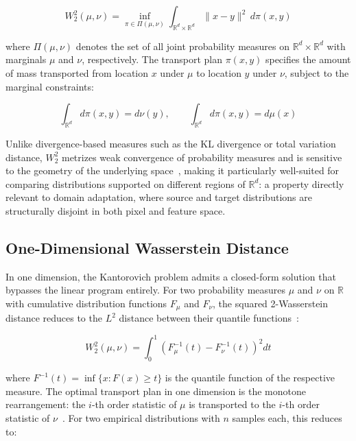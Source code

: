 \documentclass{article}
\begin{document}
	\begin{equation}
		W_2^2(\mu, \nu) = \inf_{\pi \in \Pi(\mu, \nu)} 
		\int_{\mathbb{R}^d \times \mathbb{R}^d} \|x - y\|^2 \, d\pi(x, y)
		\label{eq:kantorovich}
	\end{equation}
	
	where $\Pi(\mu, \nu)$ denotes the set of all joint probability measures on $\mathbb{R}^d \times \mathbb{R}^d$ with marginals $\mu$ and $\nu$, respectively. The transport plan $\pi(x, y)$ specifies the amount of mass transported from location $x$ 
	under $\mu$ to location $y$ under $\nu$, subject to the marginal constraints:
	
	\begin{equation}
		\int_{\mathbb{R}^d} d\pi(x, y) = d\nu(y), \qquad 
		\int_{\mathbb{R}^d} d\pi(x, y) = d\mu(x)
		\label{eq:marginals}
	\end{equation}
	
	Unlike divergence-based measures such as the KL divergence or total variation distance, $W_2^2$ metrizes weak convergence of probability measures and is sensitive to the geometry of the underlying space~\citep{martin}, making it particularly well-suited for comparing distributions supported on different regions of $\mathbb{R}^d$: a property directly relevant to domain adaptation, where source and target distributions are structurally disjoint in both pixel and feature space.
	
	\subsection{One-Dimensional Wasserstein Distance}
	
	In one dimension, the Kantorovich problem admits a closed-form solution that bypasses the linear program entirely. For two probability measures $\mu$ and $\nu$ on $\mathbb{R}$ with cumulative distribution functions $F_\mu$ and $F_\nu$, the squared 2-Wasserstein distance reduces to the $L^2$ distance between their quantile functions~\citep{marco}:
	
	\begin{equation}
		W_2^2(\mu, \nu) = \int_0^1 \left( F_\mu^{-1}(t) - F_\nu^{-1}(t) \right)^2 dt
		\label{eq:quantile}
	\end{equation}
	
	where $F^{-1}(t) = \inf\{x : F(x) \geq t\}$ is the quantile function of the respective measure. The optimal transport plan in one dimension is the monotone rearrangement: the $i$-th order statistic of $\mu$ is transported to the $i$-th order statistic of $\nu$~\citep{marco}. For two empirical distributions with $n$ samples each, this reduces to:
	
\end{document}
